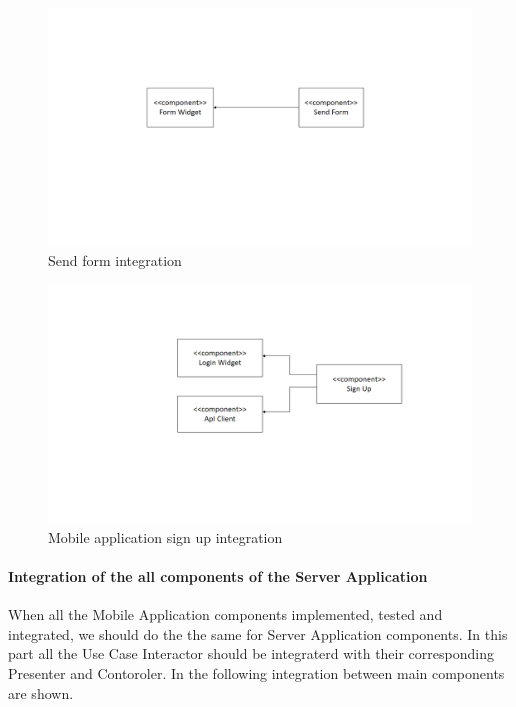 \begin{figure}[H]
\centering
\includegraphics[width=\textwidth]{Images/SendForm.png}
\caption{\label{fig:SendFormIntegrationn} Send form integration}
\end{figure}

\begin{figure}[H]
\centering
\includegraphics[width=\textwidth]{Images/SignUpIntegration.png}
\caption{\label{fig:SignUpIntegration} Mobile application sign up integration}
\end{figure}

\paragraph{Integration of the all components of the Server Application}
When all the Mobile Application components implemented, tested and integrated, we should do the the same for Server Application components. In this part all the Use Case Interactor should be integraterd with their corresponding Presenter and Contoroler. In the following integration between main components are shown.

